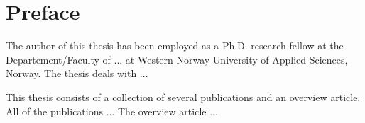 \chapter{Preface}

The author of this thesis has been employed as a Ph.D. research fellow at the
Departement/Faculty of ... at Western Norway University of Applied Sciences, Norway.
The thesis deals with ...

This thesis consists of a collection of several publications and an overview article.
All of the publications ...
The overview article ... 
